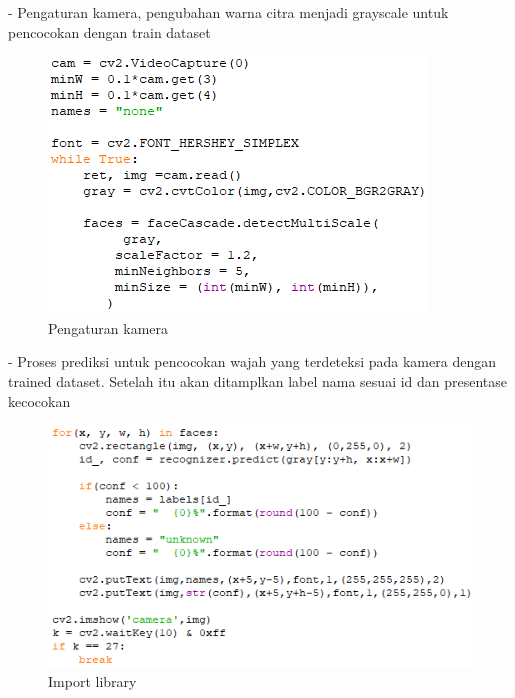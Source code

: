 \begin{enumerate}
    - Pengaturan kamera, pengubahan warna citra menjadi grayscale untuk pencocokan dengan train dataset
    \begin{figure}[h!]
        \centering
        \includegraphics[width=0.65\linewidth]{images/fr_cam17.PNG}
        \caption{Pengaturan kamera}
    \end{figure}
\newpage
    -	Proses prediksi untuk pencocokan wajah yang terdeteksi pada kamera dengan trained dataset. 
    Setelah itu akan ditamplkan label nama sesuai id dan presentase kecocokan
    \begin{figure}[h!]
        \centering
        \includegraphics[width=0.8\linewidth]{images/fr_cam18.PNG}
        \caption{Import library}
    \end{figure}


\end{enumerate}
